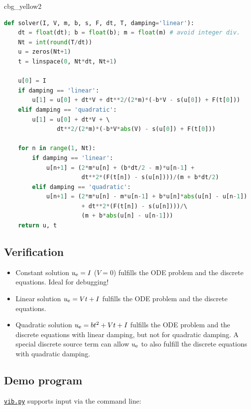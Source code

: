 \documentclass[%
oneside,                 %
final,                   %
10pt]{article}
\newenvironment{_cod_tight}[1]{
   \def\FrameCommand{\colorbox{#1}}
   \FrameRule0.6pt\MakeFramed {\FrameRestore}\vskip3mm}
   {\vskip0mm\endMakeFramed}
\newenvironment{cod}[1]{
\bgroup\rmfamily
\fboxsep=0mm\relax
\begin{_cod_tight}{#1}
\list{}{\parsep=-2mm\parskip=0mm\topsep=0pt\leftmargin=2mm
\rightmargin=2\leftmargin\leftmargin=4pt\relax}
\item\relax}
{\endlist\end{_cod_tight}\egroup}
\begin{document}
\begin{cod}{cbg_yellow2}\begin{lstlisting}[language=Python,style=simple,xleftmargin=2mm]
def solver(I, V, m, b, s, F, dt, T, damping='linear'):
    dt = float(dt); b = float(b); m = float(m) # avoid integer div.
    Nt = int(round(T/dt))
    u = zeros(Nt+1)
    t = linspace(0, Nt*dt, Nt+1)

    u[0] = I
    if damping == 'linear':
        u[1] = u[0] + dt*V + dt**2/(2*m)*(-b*V - s(u[0]) + F(t[0]))
    elif damping == 'quadratic':
        u[1] = u[0] + dt*V + \ 
               dt**2/(2*m)*(-b*V*abs(V) - s(u[0]) + F(t[0]))

    for n in range(1, Nt):
        if damping == 'linear':
            u[n+1] = (2*m*u[n] + (b*dt/2 - m)*u[n-1] +
                      dt**2*(F(t[n]) - s(u[n])))/(m + b*dt/2)
        elif damping == 'quadratic':
            u[n+1] = (2*m*u[n] - m*u[n-1] + b*u[n]*abs(u[n] - u[n-1])
                      + dt**2*(F(t[n]) - s(u[n])))/\ 
                      (m + b*abs(u[n] - u[n-1]))
    return u, t
\end{lstlisting}\end{cod}
\noindent


\subsection*{Verification}
\label{vib:ode2:verify}

\begin{itemize}
 \item Constant solution $\uex = I$ ($V=0$) fulfills the ODE problem
   and the discrete equations. Ideal for debugging!

 \item Linear solution $\uex = Vt+I$ fulfills the ODE problem and
   the discrete equations.

 \item Quadratic solution $\uex = bt^2 + Vt + I$ fulfills the ODE
   problem and the discrete equations with linear damping, but not
   for quadratic damping.
   A special discrete source term can allow $\uex$ to also fulfill
   the discrete equations with quadratic damping.
\end{itemize}

\noindent
\subsection*{Demo program}

\href{{http://tinyurl.com/nm5587k/vib/vib.py}}{\nolinkurl{vib.py}} supports input via the command line:
\end{document}
